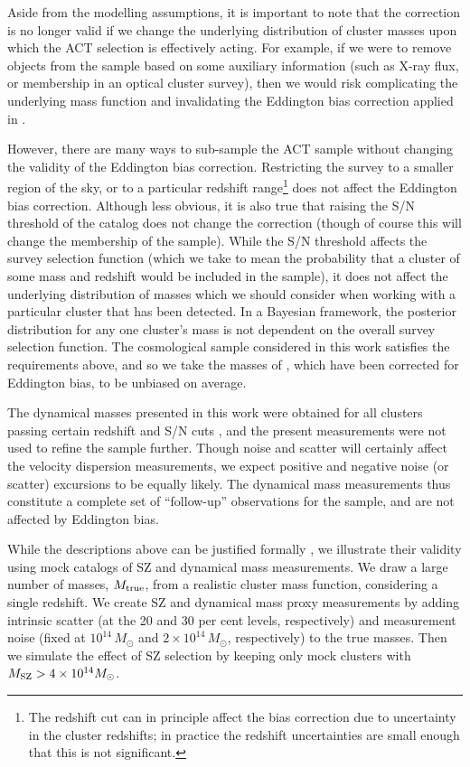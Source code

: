 Aside from the modelling assumptions, it is important to note that the correction is no longer valid if we change the underlying distribution of cluster masses upon which the ACT selection is effectively acting. For example, if we were to remove objects from the sample based on some auxiliary information (such as X-ray flux, or membership in an optical cluster survey), then we would risk complicating the underlying mass function and invalidating the Eddington bias correction applied in \cite{hasselfield13}.

However, there are many ways to sub-sample the ACT sample without changing the validity of the Eddington bias correction. Restricting the survey to a smaller region of the sky, or to a particular redshift range\footnote{The redshift cut can in principle affect the bias correction due to uncertainty in the cluster redshifts; in practice the redshift uncertainties are small enough that this is not significant.} does not affect the Eddington bias correction. Although less obvious, it is also true that raising the S/N threshold of the catalog does not change the correction (though of course this will change the membership of the sample). While the S/N threshold affects the survey selection function (which we take to mean the probability that a cluster of some mass and redshift would be included in the sample), it does not affect the underlying distribution of masses which we should consider when working with a particular cluster that has been detected. In a Bayesian framework, the posterior distribution for any one cluster's mass is not dependent on the overall survey selection function. The cosmological sample considered in this work satisfies the requirements above, and so we take the masses of \cite{hasselfield13}, which have been corrected for Eddington bias, to be unbiased on average.

The dynamical masses presented in this work were obtained for all clusters passing certain redshift and S/N cuts \citep[i.e., those in the cosmological sample of][]{hasselfield13}, and the present measurements were not used to refine the sample further.  Though noise and scatter will certainly affect the velocity dispersion measurements, we expect positive and negative noise (or scatter) excursions to be equally likely. The dynamical mass measurements thus constitute a complete set of ``follow-up'' observations for the sample, and are not affected by Eddington bias.

While the descriptions above can be justified formally \citep[see][]{evrard14}, we illustrate their validity using mock catalogs of SZ and dynamical mass measurements.  We draw a large number of masses, $M_{\rm true}$, from a realistic cluster mass function, considering a single redshift.  We create SZ and dynamical mass proxy measurements by adding intrinsic scatter (at the 20 and 30 per cent levels, respectively) and measurement noise (fixed at $10^{14}\,M_\odot$ and $2\times 10^{14}\,M_\odot$, respectively) to the true masses.  Then we simulate the effect of SZ selection by keeping only mock clusters with $M_{\rm SZ} > 4\times 10^{14} M_\odot$.


